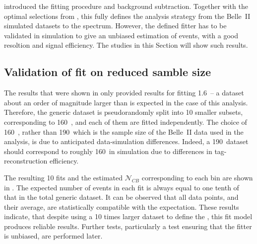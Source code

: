  introduced the fitting procedure and \BB background subtraction.
Together with the optimal selections from , this fully defines the analysis strategy from the Belle~II simulated datasets to the \BtoXsgamma spectrum.
However, the defined fitter has to be validated in simulation to give an unbiased estimation of \BtoXsgamma events, with a good resoltion and signal efficiency.
The studies in this Section will show such results.

\subsection{Validation of \texorpdfstring{\Mbc}{Mbc} fit on reduced samble size}\label{sec:mbc_fit_validation_misreconstructed}

The results that were shown in  only provided results for fitting 1.6~\invab -- a dataset about an order of magnitude larger than is expected in the case of this analysis.
Therefore, the generic \MC dataset is pseudorandomly split into 10 smaller subsets, corresponding to 160~\invfb, and each of them are fitted independently.
The choice of 160~\invfb, rather than 190~\invfb which is the sample size of the Belle~II data used in the analysis, is due to anticipated data-simulation differences.
Indeed, a 190~\invfb dataset should correspond to roughly 160~\invfb in simulation due to differences in tag-\B reconstruction efficiency.

The resulting 10 fits and the estimated $\mathcal{N}_{CB}$ corresponding to each \EB bin are shown in .
The expected number of events in each fit is always equal to one tenth of that in the total generic \MC dataset.
It can be observed that all data points, and their average, are statistically compatible with the expectation.
These results indicate, that despite using a 10 times larger dataset to define the , this \Mbc fit model produces reliable results.
Further tests, particularly a test ensuring that the fitter is unbiased, are performed later.

